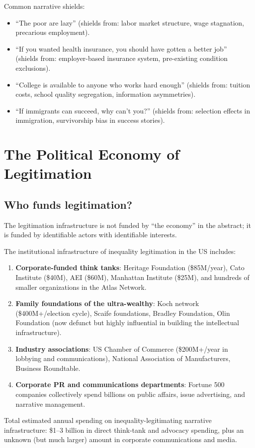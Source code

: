 Common narrative shields:
\begin{itemize}[nosep]
  \item ``The poor are lazy'' (shields from: labor market structure, wage stagnation, precarious employment).
  \item ``If you wanted health insurance, you should have gotten a better job'' (shields from: employer-based insurance system, pre-existing condition exclusions).
  \item ``College is available to anyone who works hard enough'' (shields from: tuition costs, school quality segregation, information asymmetries).
  \item ``If immigrants can succeed, why can't you?'' (shields from: selection effects in immigration, survivorship bias in success stories).
\end{itemize}

\section{The Political Economy of Legitimation}
\label{sec:ch24-political-economy}

\subsection{Who funds legitimation?}

The legitimation infrastructure is not funded by ``the economy'' in the abstract; it is funded by identifiable actors with identifiable interests.

\begin{example}
\label{ex:legitimation-funders}
The institutional infrastructure of inequality legitimation in the US includes:
\begin{enumerate}[nosep]
  \item \textbf{Corporate-funded think tanks}: Heritage Foundation (\$85M/year), Cato Institute (\$40M), AEI (\$60M), Manhattan Institute (\$25M), and hundreds of smaller organizations in the Atlas Network.
  \item \textbf{Family foundations of the ultra-wealthy}: Koch network (\$400M+/election cycle), Scaife foundations, Bradley Foundation, Olin Foundation (now defunct but highly influential in building the intellectual infrastructure).
  \item \textbf{Industry associations}: US Chamber of Commerce (\$200M+/year in lobbying and communications), National Association of Manufacturers, Business Roundtable.
  \item \textbf{Corporate PR and communications departments}: Fortune 500 companies collectively spend billions on public affairs, issue advertising, and narrative management.
\end{enumerate}
Total estimated annual spending on inequality-legitimating narrative infrastructure: \$1--3 billion in direct think-tank and advocacy spending, plus an unknown (but much larger) amount in corporate communications and media.
\end{example}

